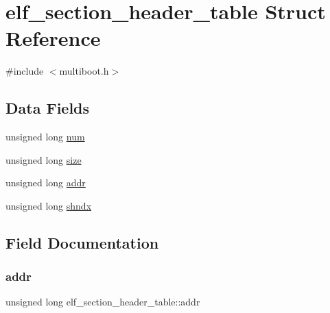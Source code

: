 \hypertarget{structelf__section__header__table}{}\section{elf\+\_\+section\+\_\+header\+\_\+table Struct Reference}
\label{structelf__section__header__table}


{\ttfamily \#include $<$multiboot.\+h$>$}

\subsection*{Data Fields}
\begin{DoxyCompactItemize}
\item 
unsigned long \hyperlink{structelf__section__header__table_a9930f5d42f50261477e32c494c0a8ede}{num}
\item 
unsigned long \hyperlink{structelf__section__header__table_a2b95483fa97636019b8080792c6968b7}{size}
\item 
unsigned long \hyperlink{structelf__section__header__table_a1b16844c046307dcb67e3e35482df083}{addr}
\item 
unsigned long \hyperlink{structelf__section__header__table_a449a7a6aaebf6946c4580649451cf463}{shndx}
\end{DoxyCompactItemize}


\subsection{Field Documentation}
\mbox{\label{structelf__section__header__table_a1b16844c046307dcb67e3e35482df083}} 
\subsubsection{\texorpdfstring{addr}{addr}}
{\footnotesize\ttfamily unsigned long elf\+\_\+section\+\_\+header\+\_\+table\+::addr}

\mbox{\label{structelf__section__header__table_a9930f5d42f50261477e32c494c0a8ede}} 
